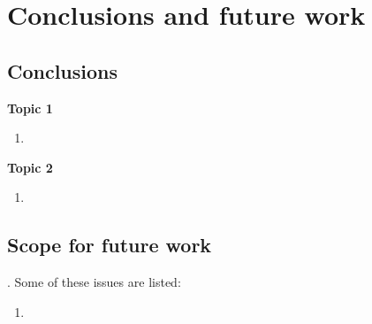 
\chapter{Conclusions and future work}

\label{Chapter8} %


\section{Conclusions}

\lipsum[1]

\textbf{Topic 1}

\begin{enumerate}
       
    \item \lipsum[1]

\end{enumerate}

\textbf{Topic 2}

\begin{enumerate}

    \item \lipsum[1]
     
\end{enumerate}

\section{Scope for future work}

\lipsum[1]. Some of these issues are listed:

\begin{enumerate}

    \item \lipsum[1]

\end{enumerate}

